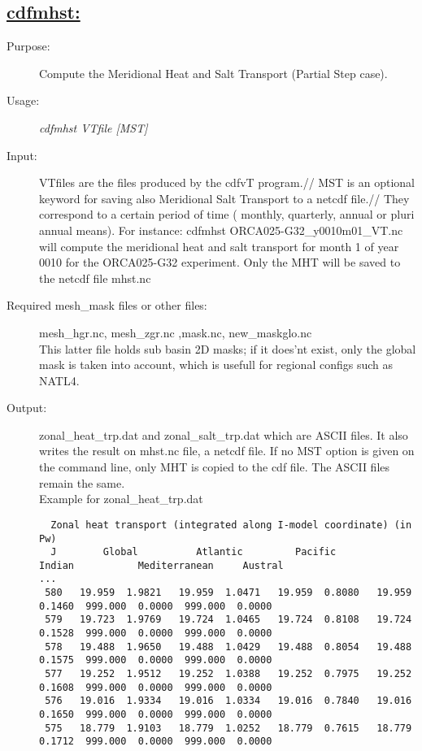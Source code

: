 \documentclass[a4paper,11pt]{article}
\begin{document}
\subsection*{\underline{cdfmhst:}}
\begin{description}
\item[Purpose:] Compute the Meridional Heat and Salt Transport (Partial Step case).
\item[Usage:] {\em cdfmhst VTfile [MST] }
\item[Input:] VTfiles are the files produced by the cdfvT program.//
MST is an optional keyword for saving also Meridional Salt Transport to a netcdf file.//
They correspond to a certain period of time ( monthly, quarterly, annual or
pluri annual means). 
For instance: cdfmhst ORCA025-G32\_y0010m01\_VT.nc
will compute the meridional heat and salt transport for month 1 of year 0010 for the ORCA025-G32 experiment. Only the MHT
will be saved to the netcdf file mhst.nc
\item[Required mesh\_mask files or other files:]   mesh\_hgr.nc, mesh\_zgr.nc ,mask.nc, new\_maskglo.nc \\
This latter file holds sub basin 2D  masks; if it does'nt exist, only the global mask is taken into account, which is usefull for regional configs such as NATL4.
\item[Output:] zonal\_heat\_trp.dat and zonal\_salt\_trp.dat which are ASCII files. It also writes the result on mhst.nc
      file, a netcdf file. If no MST option is given on the command line, only MHT is copied to the cdf file. The ASCII files
      remain the same.
\\Example for zonal\_heat\_trp.dat
\begin{scriptsize}
\begin{verbatim}
  Zonal heat transport (integrated along I-model coordinate) (in Pw)
  J        Global          Atlantic         Pacific          Indian           Mediterranean     Austral
...
 580   19.959  1.9821   19.959  1.0471   19.959  0.8080   19.959  0.1460  999.000  0.0000  999.000  0.0000
 579   19.723  1.9769   19.724  1.0465   19.724  0.8108   19.724  0.1528  999.000  0.0000  999.000  0.0000
 578   19.488  1.9650   19.488  1.0429   19.488  0.8054   19.488  0.1575  999.000  0.0000  999.000  0.0000
 577   19.252  1.9512   19.252  1.0388   19.252  0.7975   19.252  0.1608  999.000  0.0000  999.000  0.0000
 576   19.016  1.9334   19.016  1.0334   19.016  0.7840   19.016  0.1650  999.000  0.0000  999.000  0.0000
 575   18.779  1.9103   18.779  1.0252   18.779  0.7615   18.779  0.1712  999.000  0.0000  999.000  0.0000

\end{verbatim}
\end{scriptsize}
\end{description}
\end{document}
